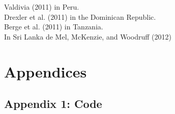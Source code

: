 \documentclass[oneside, notitlepage]{book}
\begin{document}
Valdivia (2011) in Peru. \\

Drexler et al. (2011) in the Dominican Republic. \\

Berge et al. (2011) in Tanzania. \\

In Sri Lanka de Mel, McKenzie, and Woodruff (2012) \\


\chapter{Appendices}
\label{cha:appendices}

\section{Appendix 1: Code}
\label{sec:appendix-1}











































\end{document}
